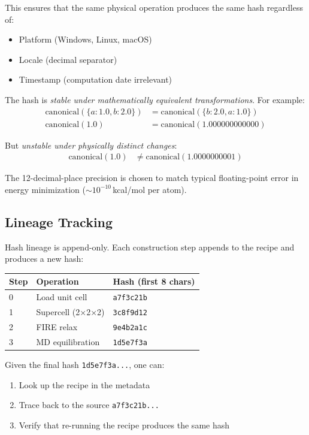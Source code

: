 \documentclass[11pt]{article}
\begin{document}
This ensures that the same physical operation produces the same hash regardless of:
\begin{itemize}
\item Platform (Windows, Linux, macOS)
\item Locale (decimal separator)
\item Timestamp (computation date irrelevant)
\end{itemize}

The hash is \textit{stable under mathematically equivalent transformations}. For example:
\begin{align*}
\text{canonical}(\{a: 1.0, b: 2.0\}) &= \text{canonical}(\{b: 2.0, a: 1.0\}) \\
\text{canonical}(1.0) &= \text{canonical}(1.000000000000)
\end{align*}

But \textit{unstable under physically distinct changes}:
\begin{align*}
\text{canonical}(1.0) &\neq \text{canonical}(1.0000000001)
\end{align*}

The 12-decimal-place precision is chosen to match typical floating-point error in energy minimization ($\sim 10^{-10}$\,kcal/mol per atom).

\subsection{Lineage Tracking}

Hash lineage is append-only. Each construction step appends to the recipe and produces a new hash:

\begin{center}
\begin{tabular}{lll}
\toprule
Step & Operation & Hash (first 8 chars) \\
\midrule
0 & Load unit cell & \texttt{a7f3c21b} \\
1 & Supercell (2×2×2) & \texttt{3c8f9d12} \\
2 & FIRE relax & \texttt{9e4b2a1c} \\
3 & MD equilibration & \texttt{1d5e7f3a} \\
\bottomrule
\end{tabular}
\end{center}

Given the final hash \texttt{1d5e7f3a...}, one can:
\begin{enumerate}
\item Look up the recipe in the metadata
\item Trace back to the source \texttt{a7f3c21b...}
\item Verify that re-running the recipe produces the same hash
\end{enumerate}
\end{document}
